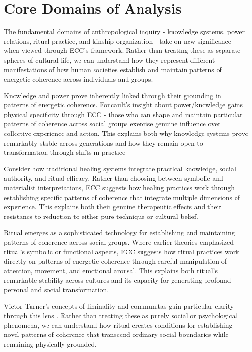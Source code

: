 \section{Core Domains of Analysis}

The fundamental domains of anthropological inquiry - knowledge systems, power relations, ritual practice, and kinship organization - take on new significance when viewed through ECC's framework. Rather than treating these as separate spheres of cultural life, we can understand how they represent different manifestations of how human societies establish and maintain patterns of energetic coherence across individuals and groups.

Knowledge and power prove inherently linked through their grounding in patterns of energetic coherence. Foucault's insight about power/knowledge gains physical specificity through ECC - those who can shape and maintain particular patterns of coherence across social groups exercise genuine influence over collective experience and action. This explains both why knowledge systems prove remarkably stable across generations and how they remain open to transformation through shifts in practice.

Consider how traditional healing systems integrate practical knowledge, social authority, and ritual efficacy. Rather than choosing between symbolic and materialist interpretations, ECC suggests how healing practices work through establishing specific patterns of coherence that integrate multiple dimensions of experience. This explains both their genuine therapeutic effects and their resistance to reduction to either pure technique or cultural belief.

Ritual emerges as a sophisticated technology for establishing and maintaining patterns of coherence across social groups. Where earlier theories emphasized ritual's symbolic or functional aspects, ECC suggests how ritual practices work directly on patterns of energetic coherence through careful manipulation of attention, movement, and emotional arousal. This explains both ritual's remarkable stability across cultures and its capacity for generating profound personal and social transformation.

Victor Turner's concepts of liminality and communitas gain particular clarity through this lens \cite{turner1967forest}. Rather than treating these as purely social or psychological phenomena, we can understand how ritual creates conditions for establishing novel patterns of coherence that transcend ordinary social boundaries while remaining physically grounded.

